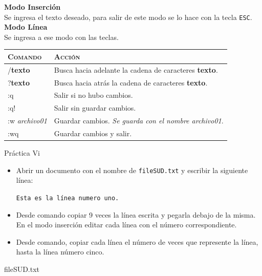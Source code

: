 \documentclass{beamer}
\begin{document}
\begin{frame}
\textbf{Modo Inserción}\\
Se ingresa el texto deseado, para salir de este modo se lo hace con la tecla \texttt{ESC}.\\[0.5cm]
\textbf{Modo Línea}\\
Se ingresa a ese modo con las teclas.
{\scriptsize
\begin{tabular}{l|l}
\textsc{Comando}&\textsc{Acción}  \\\hline
/\textbf{texto} & Busca hacia adelante la cadena de caracteres \textbf{texto}.\\\hline
?\textbf{texto} & Busca hacia atrás la cadena de caracteres \textbf{texto}.\\\hline
:q & Salir si no hubo cambios. \\\hline
:q! & Salir sin guardar cambios.\\\hline
:w \textit{archivo01} & Guardar cambios. \textit{Se guarda con el nombre archivo01}.\\\hline
:wq & Guardar cambios y salir.

\end{tabular}
}
\end{frame}
\begin{frame}{Práctica Vi}
\begin{itemize}
    \item Abrir un documento con el nombre de \texttt{fileSUD.txt} y escribir la siguiente línea:
    \begin{center}
        \texttt{Esta es la línea numero uno.}
    \end{center}
    \item Desde comando copiar 9 veces la línea escrita y pegarla debajo de la misma. En el modo inserción editar cada línea con el número correspondiente.
    \item Desde comando, copiar cada línea el número de veces que represente la línea, hasta la línea número cinco.
\end{itemize}
\end{frame}
\begin{frame}{fileSUD.txt}

\end{frame}
\end{document}
